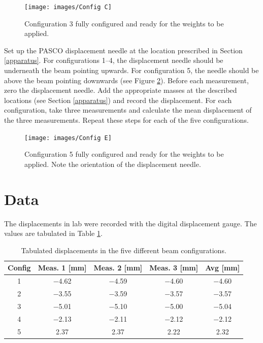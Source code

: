 \documentclass[12 pt]{article}
\begin{document}
\begin{figure}[htbp]
\centering
\texttt{[image: images/Config C]}
\caption{Configuration \num{3} fully configured and ready for the weights to be applied.}
\label{fig:config_3_img}
\end{figure}

Set up the PASCO displacement needle at the location prescribed in Section \ref{apparatus}. For configurations 1--4, the displacement needle should be underneath the beam pointing upwards. For configuration \num{5}, the needle should be above the beam pointing downwards (see Figure \ref{fig:config_5_img}). Before each measurement, zero the displacement needle. Add the appropriate masses at the described locations (see Section \ref{apparatus}) and record the displacement. For each configuration, take three measurements and calculate the mean displacement of the three measurements. Repeat these steps for each of the five configurations.

\begin{figure}[htbp]
\centering
\texttt{[image: images/Config E]}
\caption{Configuration \num{5} fully configured and ready for the weights to be applied. Note the orientation of the displacement needle.}
\label{fig:config_5_img}
\end{figure}

\section{Data} \label{data}
The displacements in lab were recorded with the digital displacement gauge. The values are tabulated in Table \ref{tbl:data}.

\begin{table}[!htbp]
\caption{Tabulated displacements in the five different beam configurations.}
\begin{center}
	\begin{tabular}{|c|c|c|c|c|}
		\hline
		Config&Meas. 1 [\unit{\mm}]&Meas. 2 [\unit{\mm}]&Meas. 3 [\unit{\mm}]&Avg [\unit{\mm}]\\
		\hline
		\num{1}&\num{-4.62}&\num{-4.59}&\num{-4.60}&\num{-4.60}\\
		\hline
		\num{2}&\num{-3.55}&\num{-3.59}&\num{-3.57}&\num{-3.57}\\
		\hline
		\num{3}&\num{-5.01}&\num{-5.10}&\num{-5.00}&\num{-5.04}\\
		\hline
		\num{4}&\num{-2.13}&\num{-2.11}&\num{-2.12}&\num{-2.12}\\
		\hline
		\num{5}&\num{2.37}&\num{2.37}&\num{2.22}&\num{2.32}\\
		\hline
	\end{tabular}
\end{center}
\label{tbl:data}
\end{table}
\end{document}
